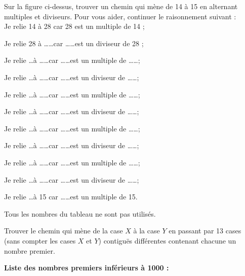 \begin{exercice}
\begin{center} 

\end{center}

Sur la figure ci-dessus, trouver un chemin qui mène de 14 à 15 en alternant multiples et diviseurs. Pour vous aider, continuer le raisonnement suivant : \\[1em]
Je relie 14 à 28 car 28 est un multiple de 14 ;

Je relie 28 à \ldots \ldots car \ldots \ldots est un diviseur de 28 ;

Je relie \ldots à \ldots \ldots car \ldots \ldots est un multiple de \ldots \ldots ;

Je relie \ldots à \ldots \ldots car \ldots \ldots est un diviseur de \ldots \ldots ;

Je relie \ldots à \ldots \ldots car \ldots \ldots est un multiple de \ldots \ldots ;

Je relie \ldots à \ldots \ldots car \ldots \ldots est un diviseur de \ldots \ldots ;

Je relie \ldots à \ldots \ldots car \ldots \ldots est un multiple de \ldots \ldots ;

Je relie \ldots à \ldots \ldots car \ldots \ldots est un diviseur de \ldots \ldots ;

Je relie \ldots à \ldots \ldots car \ldots \ldots est un multiple de \ldots \ldots ;

Je relie \ldots à \ldots \ldots car \ldots \ldots est un diviseur de \ldots \ldots ;

Je relie \ldots à 15 car \ldots \ldots est un multiple de 15.

Tous les nombres du tableau ne sont pas utilisés.

\end{exercice}



\newpage





\begin{exercice}
Trouver le chemin qui mène de la case $X$ à la case $Y$ en passant par 13 cases (sans compter les cases $X$ et $Y$) contiguës différentes contenant chacune un nombre premier.

\begin{center} 

\end{center}

\begin{center} 
\textbf{Liste des nombres premiers inférieurs à 1000 :}
\vspace{1em}


\end{center}
\end{exercice}

